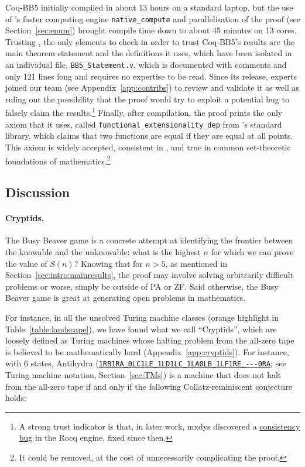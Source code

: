 \documentclass[a4paper,british]{article}
\theoremstyle{definition} %
\numberwithin{equation}{section}
\theoremstyle{definition} %
\newcommand{\tm}[1]{\href{https://bbchallenge.org/#1}{\texttt{\nolinkurl{#1}}}}
\newcommand{\CoqBB}{Coq-BB5\xspace}
\begin{document}
\CoqBB initially compiled in about 13 hours on a standard laptop, but the use of \Coq's faster computing engine \texttt{native\_compute} \cite{nativecompute} and parallelisation of the proof (see Section~\ref{sec:enum}) brought compile time down to about 45 minutes on 13 cores. Trusting \Coq, the only elements to check in order to trust \CoqBB's results are the main theorem statement and the definitions it uses, which have been isolated in an individual file, \texttt{BB5\_Statement.v}, which is documented with comments and only 121 lines long and requires no \Coq expertise to be read. Since its release, \Coq experts joined our team (see Appendix~\ref{app:contribs}) to review and validate it as well as ruling out the possibility that the proof would try to exploit a potential \Coq bug to falsely claim the results.\footnote{A strong trust indicator is that, in later work, mxdys discovered a \href{https://github.com/rocq-prover/rocq/issues/20413}{consistency bug} in the Rocq engine, fixed since then.} Finally, after compilation, the proof prints the only axiom that it uses, called \texttt{functional\_extensionality\_dep} from \Coq's standard library, which claims that two functions are equal if they are equal at all points. This axiom is widely accepted, consistent in \Coq, and true in common set-theoretic foundations of mathematics.\footnote{It could be removed, at the cost of unnecessarily complicating the proof.}


\subsection{Discussion}\label{sec:intro:discuss}

\paragraph{Cryptids.} The Busy Beaver game is a concrete attempt at identifying the frontier between the knowable and the unknowable: what is the highest $n$ for which we can prove the value of $S(n)$? Knowing that for $n > 5$, as mentioned in Section~\ref{sec:intro:mainresults}, the proof may involve solving arbitrarily difficult problems or worse, simply be outside of PA or ZF. Said otherwise, the Busy Beaver game is great at generating open problems in mathematics.


For instance, in all the unsolved Turing machine classes (orange highlight in Table~\ref{table:landscape}), we have found what we call ``Cryptids'', which are loosely defined as Turing machines whose halting problem from the all-zero tape is believed to be mathematically hard (Appendix~\ref{app:cryptids}). For instance, with 6 states, Antihydra (\tm{1RB1RA_0LC1LE_1LD1LC_1LA0LB_1LF1RE_---0RA}; see Turing machine notation, Section~\ref{sec:TMs}) is a machine that does not halt from the all-zero tape if and only if the following Collatz-reminiscent conjecture holds:
\end{document}
